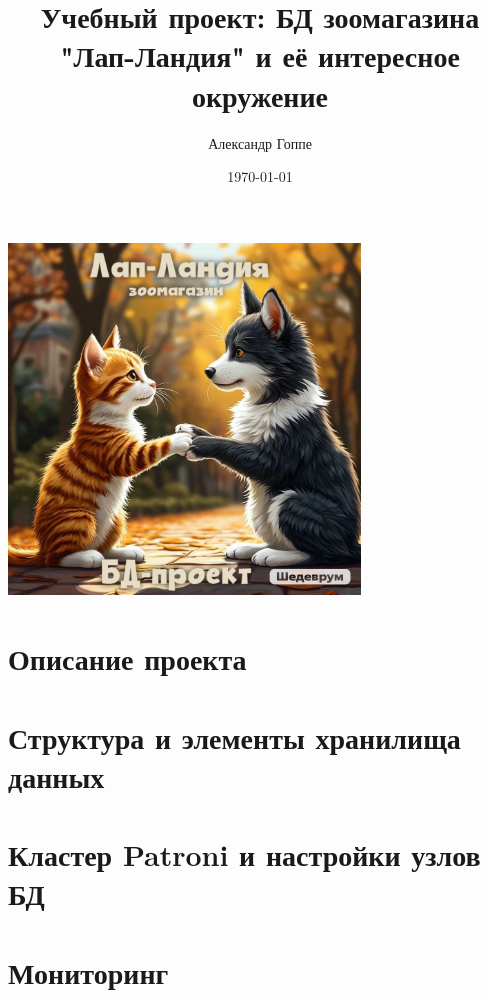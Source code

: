 \documentclass[a4paper,12pt]{article}
\title{Учебный проект: БД зоомагазина "Лап-Ландия" и её интересное окружение}
\author{Александр Гоппе}
\date{}
\begin{document}
    \maketitle

    \begin{center}
        \includegraphics[width=0.7\textwidth]{title} %
    \end{center}

    \vfill
    \begin{center}
        \date{\today}
    \end{center}
    \newpage

    \tableofcontents
    \newpage

    \section{Описание проекта}\label{sec:-projectdesc-}
    


    \section{Структура и элементы хранилища данных}\label{sec:-dbstructure-}
    


    \section{Кластер Patroni и настройки узлов БД}\label{sec:-patronicluster-}
    

    \section{Мониторинг}\label{sec:-monitoring-}
    
\end{document}
